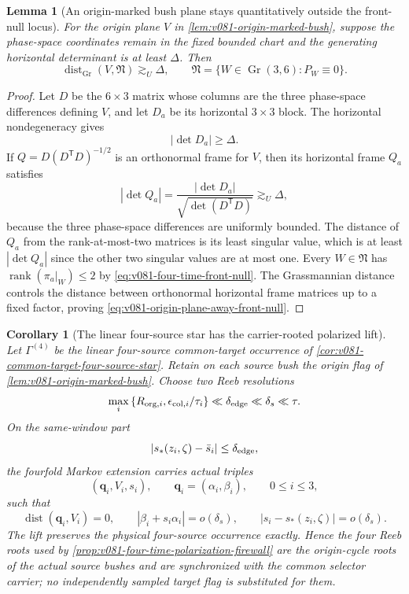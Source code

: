 \documentclass[10pt]{article}
\newtheorem{lemma}[theorem]{Lemma}
\newtheorem{corollary}[theorem]{Corollary}
\newcommand{\rank}{\operatorname{rank}}
\newcommand{\dist}{\operatorname{dist}}
\newcommand{\Gr}{\operatorname{Gr}}
\begin{document}
\begin{lemma}[An origin-marked bush plane stays quantitatively outside the front-null locus]
\label{lem:v081-origin-plane-away-front-null}
For the origin plane \(V\) in
\cref{lem:v081-origin-marked-bush}, suppose the phase-space coordinates remain in the fixed bounded
chart and the generating horizontal determinant is at least \(\Delta\).  Then
\begin{equation}
\label{eq:v081-origin-plane-away-front-null}
\boxed{
\dist_{\Gr}(V,\mathfrak N)
\gtrsim_U
\Delta,
\qquad
\mathfrak N=\{W\in\Gr(3,6):P_W\equiv0\}.
}
\end{equation}
\end{lemma}

\begin{proof}
Let \(D\) be the \(6\times3\) matrix whose columns are the three phase-space differences defining
\(V\), and let \(D_a\) be its horizontal \(3\times3\) block.  The horizontal nondegeneracy gives
\[
|\det D_a|\ge\Delta.
\]
If \(Q=D(D^{\mathsf T}D)^{-1/2}\) is an orthonormal frame for \(V\), then its horizontal frame
\(Q_a\) satisfies
\[
|\det Q_a|
=
\frac{|\det D_a|}{\sqrt{\det(D^{\mathsf T}D)}}
\gtrsim_U
\Delta,
\]
because the three phase-space differences are uniformly bounded.  The distance of \(Q_a\) from
the rank-at-most-two matrices is its least singular value, which is at least
\(|\det Q_a|\) since the other two singular values are at most one.  Every
\(W\in\mathfrak N\) has \(\rank(\pi_a|_W)\le2\) by
\eqref{eq:v081-four-time-front-null}.  The Grassmannian distance controls the distance between
orthonormal horizontal frame matrices up to a fixed factor, proving
\eqref{eq:v081-origin-plane-away-front-null}.
\end{proof}

\begin{corollary}[The linear four-source star has the carrier-rooted polarized lift]
\label{prob:v081-common-target-carrier-rooted-lift}
Let \(\Gamma^{(4)}\) be the linear four-source common-target occurrence of
\cref{cor:v081-common-target-four-source-star}.  Retain on each source bush the origin flag of
\cref{lem:v081-origin-marked-bush}.  Choose two Reeb resolutions
\[
\max_i\left\{
R_{{\rm org},i},
\epsilon_{{\rm col},i}/\tau_i
\right\}
\ll
\delta_{\rm edge}
\ll
\delta_s
\ll
\tau.
\]
On the same-window part
\[
|s_*(z_i,\zeta)-\bar s_i|\le\delta_{\rm edge},
\]
the fourfold Markov extension carries actual triples
\[
(\mathbf q_i,V_i,s_i),
\qquad
\mathbf q_i=(\alpha_i,\beta_i),
\qquad
0\le i\le3,
\]
such that
\begin{equation}
\label{eq:v081-carrier-rooted-polarized-lift}
\boxed{
\dist(\mathbf q_i,V_i)=0,
\qquad
|\beta_i+s_i\alpha_i|=o(\delta_s),
\qquad
|s_i-s_*(z_i,\zeta)|=o(\delta_s).
}
\end{equation}
The lift preserves the physical four-source occurrence exactly.  Hence the four Reeb roots used by
\cref{prop:v081-four-time-polarization-firewall} are the origin-cycle roots of the actual source
bushes and are synchronized with the common selector carrier; no independently sampled target
flag is substituted for them.
\end{corollary}
\end{document}
